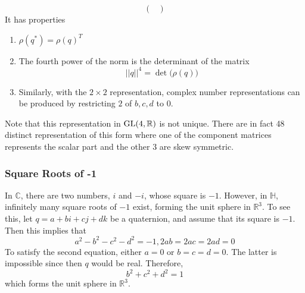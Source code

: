 \begin{proposition}
\begin{equation}
\begin{pmatrix}
        \end{pmatrix}
      \end{equation}
      It has properties
      \begin{enumerate}
        \item $\rho(q^*) = \rho(q)^T$
        \item The fourth power of the norm is the determinant of the matrix 
          \begin{equation}
            ||q||^4 = \det\big( \rho (q)\big)
          \end{equation}
        \item Similarly, with the $2\times 2$ representation, complex number representations can be produced by restricting $2$ of $b, c, d$ to $0$. 
      \end{enumerate}
      \end{proposition}

      Note that this representation in $\operatorname{GL}(4, \mathbb{R})$ is not unique. There are in fact 48 distinct representation of this form where one of the component matrices represents the scalar part and the other 3 are skew symmetric. 

    \subsubsection{Square Roots of -1}

      In $\mathbb{C}$, there are two numbers, $i$ and $-i$, whose square is $-1$. However, in $\mathbb{H}$, infinitely many square roots of $-1$ exist, forming the unit sphere in $\mathbb{R}^3$. To see this, let $q = a+bi+cj+dk$ be a quaternion, and assume that its square is $-1$. Then this implies that
      \begin{equation}
        a^2 - b^2 -c^2 -d^2 = -1, 2ab = 2ac = 2ad = 0
      \end{equation}
      To satisfy the second equation, either $a=0$ or $b=c=d=0$. The latter is impossible since then $q$ would be real. Therefore, 
      \begin{equation}
        b^2 + c^2 + d^2 = 1
      \end{equation}
      which forms the unit sphere in $\mathbb{R}^3$. 

